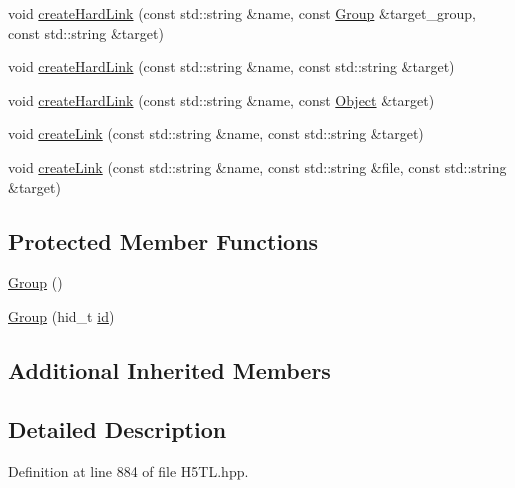 \begin{DoxyCompactItemize}
void \hyperlink{class_h5_t_l_1_1_group_a574293c18fed3e5391267dd3c33bf81a}{create\-Hard\-Link} (const std\-::string \&name, const \hyperlink{class_h5_t_l_1_1_group}{Group} \&target\-\_\-group, const std\-::string \&target)
\item 
void \hyperlink{class_h5_t_l_1_1_group_a709506d6232025482633abcb97a4d7c5}{create\-Hard\-Link} (const std\-::string \&name, const std\-::string \&target)
\item 
void \hyperlink{class_h5_t_l_1_1_group_a2b8d910eb930a2ec45b3051452a79d73}{create\-Hard\-Link} (const std\-::string \&name, const \hyperlink{class_h5_t_l_1_1_object}{Object} \&target)
\item 
void \hyperlink{class_h5_t_l_1_1_group_a3161bd364a0f5f4df9d81619482ff559}{create\-Link} (const std\-::string \&name, const std\-::string \&target)
\item 
void \hyperlink{class_h5_t_l_1_1_group_af143a648b8feec1260727e16960afff1}{create\-Link} (const std\-::string \&name, const std\-::string \&file, const std\-::string \&target)
\end{DoxyCompactItemize}
\subsection*{Protected Member Functions}
\begin{DoxyCompactItemize}
\item 
\hyperlink{class_h5_t_l_1_1_group_ad2459b5cc9b72fe123565b5afa9c0c8a}{Group} ()
\item 
\hyperlink{class_h5_t_l_1_1_group_a23cda162d64c296d39cdd3c63551c275}{Group} (hid\-\_\-t \hyperlink{class_h5_t_l_1_1_i_d_ade483b65e8a77310b025e86b11cbc38c}{id})
\end{DoxyCompactItemize}
\subsection*{Additional Inherited Members}


\subsection{Detailed Description}


Definition at line 884 of file H5\-T\-L.\-hpp.



